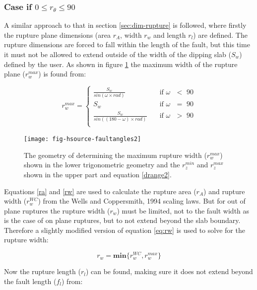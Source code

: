\subsubsection{Case if  $0 \leq r_\theta \leq 90$} \label{sec:0to90}

A similar approach to that in section \ref{sec:dim-rupture} is followed, where firstly the rupture plane dimensions (area $r_A$, width $r_w$ and length $r_l$) are defined. The rupture dimensions are forced to fall 
within the length of the fault, but this time it must not be allowed to extend outside of the width of the dipping slab ($S_w$) defined by the user. As shown in figure \ref{fig:deltaeq} the 
maximum width of the rupture plane ($r_w^{max}$) is found from:

\begin{equation}\label{rwmax}
r_w^{max} = 
\begin{cases}
 \frac{ S_w }{sin (\omega \times rad)}		& \quad \mbox{if $\omega$ $<$ 90} \\
S_w							& \quad \mbox{if $\omega$ $=$ 90} \\
 \frac{ S_w }{sin ((180 - \omega ) \times rad)}	& \quad \mbox{if $\omega$ $>$ 90} \\
\end{cases}
\end{equation}


\begin{figure}[htp]
\centerline{\texttt{[image: fig-hsource-faultangles2]}}
\caption{The geometry of determining the maximum rupture width ($r_w^{max}$) shown in the lower trigonometric geometry and the $r_z^{min}$ and $r_z^{max}$ shown in the upper part and equation \ref{drange2}.}
\label{fig:deltaeq}
\end{figure}

Equations \ref{ra} and \ref{rw} are used to calculate the rupture area ($r_A$) and rupture width ($r_w^{WC}$) from the Wells and Coppersmith, 1994 scaling laws. But for out of plane ruptures 
the rupture width ($r_w$) must be limited, not to the fault width as is the case of on plane ruptures, but to not extend beyond the slab boundary. Therefore a slightly modified version of 
equation \ref{eq:rw} is used to solve for the rupture width:

\begin{equation} \label{rw090}
r_w = \mathbf{min}\{ r_w^{WC}, r_w^{max}\}
\end{equation}

Now the rupture length ($r_l$) can be found, making sure it does not extend beyond the fault length ($f_l$) from:

